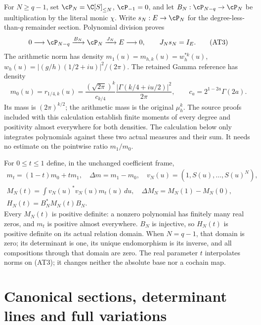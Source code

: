 For $N\ge q-1$, set $\cP_N=\C[S]_{\le N}$,
$\cP_{-1}=0$, and let
$B_N:\cP_{N-q}\to\cP_N$ be multiplication by the literal monic
$\chi$. Write $s_N:E\to\cP_N$ for the degree-less-than-$q$
remainder section. Polynomial division proves
\[
 0\longrightarrow\cP_{N-q}\xrightarrow{B_N}\cP_N
       \xrightarrow{J_N}E\longrightarrow0,
 \qquad J_Ns_N=I_E.                         \tag{AT3}
\]
The arithmetic norm has density
$m_1(u)=m_{h,k}(u)=w_h^{*k}(u)$,
$w_h(u)=|(g/h)(1/2+iu)|^2/(2\pi)$.
The retained Gamma reference has density
\[
 m_0(u)=r_{1/4,k}(u)
 =\frac{(\sqrt{2\pi})^k}{c_{k/4}}
       \frac{|\Gamma(k/4+iu/2)|^2}{2\pi},
 \qquad c_a=2^{1-2a}\Gamma(2a).              \tag{AT4}
\]
Its mass is $(2\pi)^{k/2}$; the arithmetic mass is the original
$\mu_h^k$. The source proofs included with this calculation establish
finite moments of every degree and positivity almost everywhere for
both densities. The calculation below only integrates polynomials
against these two actual measures and their sum. It needs no estimate
on the pointwise ratio $m_1/m_0$.

For $0\le t\le1$ define, in the unchanged coefficient frame,
\[
 \begin{gathered}
 m_t=(1-t)m_0+tm_1,\quad \Delta m=m_1-m_0,
 \quad v_N(u)=(1,S(u),\ldots,S(u)^N),\\
 M_N(t)=\int v_N(u)^*v_N(u)m_t(u)\,du,
 \quad \Delta M_N=M_N(1)-M_N(0),\\
 H_N(t)=B_N^*M_N(t)B_N.                     \end{gathered}
 \tag{AT5}
\]
Every $M_N(t)$ is positive definite: a nonzero polynomial has finitely
many real zeros, and $m_t$ is positive almost everywhere. $B_N$ is
injective, so $H_N(t)$ is positive definite on its actual relation
domain. When $N=q-1$, that domain is zero; its determinant is one,
its unique endomorphism is its inverse, and all compositions through
that domain are zero. The real parameter $t$ interpolates norms on
(AT3); it changes neither the absolute base nor a cochain map.

\section{Canonical sections, determinant lines and full variations}

